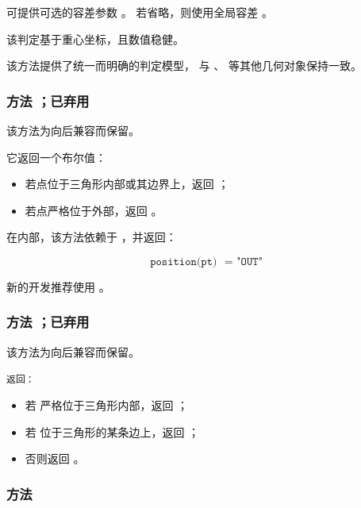 \medskip

可提供可选的容差参数 。
若省略，则使用全局容差 。

\medskip

该判定基于重心坐标，且数值稳健。

\medskip

该方法提供了统一而明确的判定模型，
与 、 等其他几何对象保持一致。



\subsubsection{方法 ；已弃用}
\label{ssub:_triangle_in__out_pt}


该方法为向后兼容而保留。

它返回一个布尔值：

\begin{itemize}
  \item 若点位于三角形内部或其边界上，返回 ；
  \item 若点严格位于外部，返回 。
\end{itemize}

\medskip

在内部，该方法依赖于
，并返回：

\[
\texttt{position(pt) ~= "OUT"}
\]

\medskip

新的开发推荐使用
。


\subsubsection{方法 ；已弃用}
\label{ssub:method_triangle_on_triangle}

该方法为向后兼容而保留。


\medskip

\texttt{返回：}
\begin{itemize}
  \item 若  严格位于三角形内部，返回 ；
  \item 若  位于三角形的某条边上，返回 ；
  \item 否则返回 。
\end{itemize}




\subsubsection{方法 }
\label{ssub:_triangle_check__equilateral}

